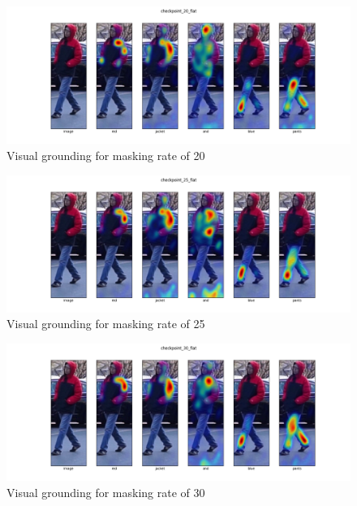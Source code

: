 \begin{figure}[htbp]
  \includegraphics[width=\linewidth]{img/mrtd_masking_ratio/mrtd-checkpoint_20_flat.png}
  \caption{Visual grounding for masking rate of 20}
  \label{fig:mtrd_2}
\end{figure}

\begin{figure}[htbp]
  \includegraphics[width=\linewidth]{img/mrtd_masking_ratio/mrtd-checkpoint_25_flat.png}
  \caption{Visual grounding for masking rate of 25} 
  \label{fig:mtrd_3} 
\end{figure}

\begin{figure}[htbp]
  \includegraphics[width=\linewidth]{img/mrtd_masking_ratio/mrtd-checkpoint_30_flat.png}
  \caption{Visual grounding for masking rate of 30}
  \label{fig:mtrd_4}
\end{figure}

